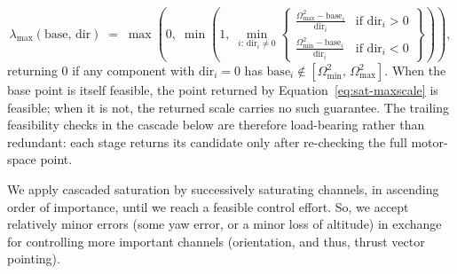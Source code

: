 \documentclass[conf]{new-aiaa}
\begin{document}
\small
\begin{equation}
\label{eq:sat-maxscale}
\lambda_{\max}(\text{base},\, \text{dir}) \;=\; \max\!\left(0,\; \min\!\left(1,\; \min_{i:\,\text{dir}_i \neq 0}\!\left\{
\begin{array}{ll}
\tfrac{\Omega^2_{\max} - \text{base}_i}{\text{dir}_i} & \text{if dir}_i > 0 \\[3pt]
\tfrac{\Omega^2_{\min} - \text{base}_i}{\text{dir}_i} & \text{if dir}_i < 0
\end{array}
\right\}\right)\right),
\end{equation}
\normalsize
returning $0$ if any component with $\text{dir}_i = 0$ has $\text{base}_i \notin [\Omega^2_{\min},\, \Omega^2_{\max}]$. When the base point is itself feasible, the point returned by Equation~\ref{eq:sat-maxscale} is feasible; when it is not, the returned scale carries no such guarantee. The trailing feasibility checks in the cascade below are therefore load-bearing rather than redundant: each stage returns its candidate only after re-checking the full motor-space point.

We apply cascaded saturation by successively saturating channels, in ascending order of importance, until we reach a feasible control effort. So, we accept relatively minor errors (some yaw error, or a minor loss of altitude) in exchange for controlling more important channels (orientation, and thus, thrust vector pointing). 
\end{document}
